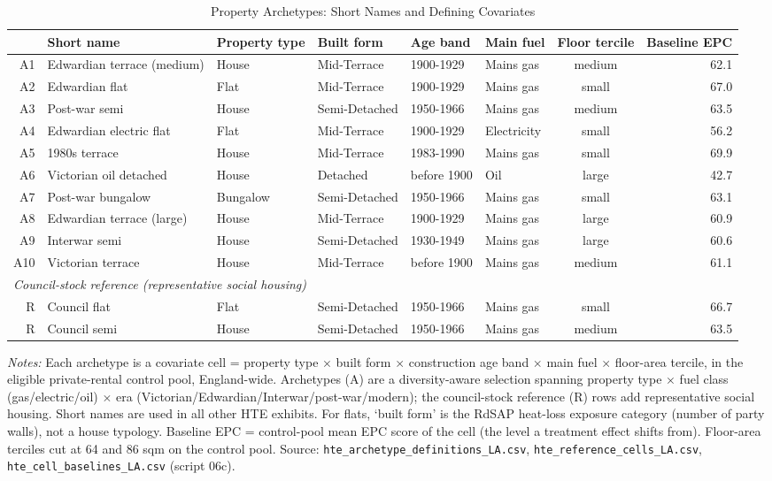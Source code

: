 \begin{table}[htbp]
\centering
\caption{Property Archetypes: Short Names and Defining Covariates}
\label{tab:hte_archetypes}
\scriptsize
\begin{tabular}{rlllllcr}
\toprule
 & Short name & Property type & Built form & Age band & Main fuel & Floor tercile & Baseline EPC \\
\midrule
A1 & Edwardian terrace (medium) & House & Mid-Terrace & 1900-1929 & Mains gas & medium & 62.1 \\
A2 & Edwardian flat & Flat & Mid-Terrace & 1900-1929 & Mains gas & small & 67.0 \\
A3 & Post-war semi & House & Semi-Detached & 1950-1966 & Mains gas & medium & 63.5 \\
A4 & Edwardian electric flat & Flat & Mid-Terrace & 1900-1929 & Electricity & small & 56.2 \\
A5 & 1980s terrace & House & Mid-Terrace & 1983-1990 & Mains gas & small & 69.9 \\
A6 & Victorian oil detached & House & Detached & before 1900 & Oil & large & 42.7 \\
A7 & Post-war bungalow & Bungalow & Semi-Detached & 1950-1966 & Mains gas & small & 63.1 \\
A8 & Edwardian terrace (large) & House & Mid-Terrace & 1900-1929 & Mains gas & large & 60.9 \\
A9 & Interwar semi & House & Semi-Detached & 1930-1949 & Mains gas & large & 60.6 \\
A10 & Victorian terrace & House & Mid-Terrace & before 1900 & Mains gas & medium & 61.1 \\
\midrule
\multicolumn{8}{l}{\textit{Council-stock reference (representative social housing)}} \\
R & Council flat & Flat & Semi-Detached & 1950-1966 & Mains gas & small & 66.7 \\
R & Council semi & House & Semi-Detached & 1950-1966 & Mains gas & medium & 63.5 \\
\bottomrule
\end{tabular}
\begin{minipage}{0.95\textwidth}
\vspace{4pt}
\footnotesize
\textit{Notes:} Each archetype is a covariate cell = property type $\times$ built form
$\times$ construction age band $\times$ main fuel $\times$ floor-area tercile, in the
eligible private-rental control pool, England-wide. Archetypes (A) are a diversity-aware
selection spanning property type $\times$ fuel class (gas/electric/oil) $\times$ era
(Victorian/Edwardian/Interwar/post-war/modern); the council-stock reference (R) rows add
representative social housing. Short names are used in all other HTE exhibits. For flats,
`built form' is the RdSAP heat-loss exposure category (number of party walls), not a house
typology. Baseline EPC = control-pool mean EPC score of the cell (the level a treatment
effect shifts from).
Floor-area terciles cut at 64 and 86 sqm on the control pool.
Source: \texttt{hte\_archetype\_definitions\_LA.csv}, \texttt{hte\_reference\_cells\_LA.csv},
\texttt{hte\_cell\_baselines\_LA.csv} (script 06c).
\end{minipage}
\end{table}
